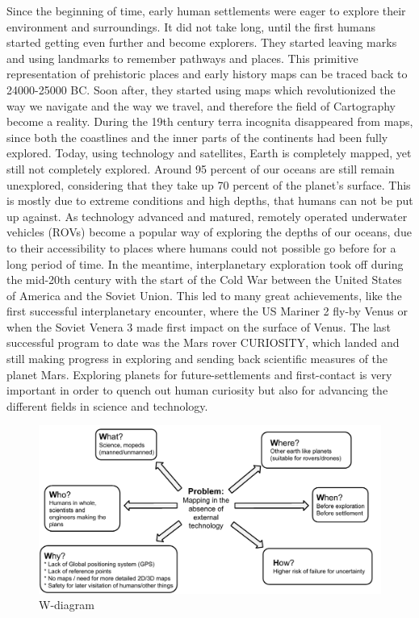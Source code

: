 Since the beginning of time, early human settlements were eager to explore their environment and surroundings. It did not take long, until the first humans started getting even further and become explorers. They started leaving marks and using landmarks to remember pathways and places. This primitive representation of prehistoric places and early history maps can be traced back to 24000-25000 BC\cite{cavedrawings}. Soon after, they started using maps which revolutionized the way we navigate and the way we travel, and therefore the field of Cartography become a reality. During the 19th century terra incognita disappeared from maps, since both the coastlines and the inner parts of the continents had been fully explored. Today, using technology and satellites, Earth is completely mapped, yet still not completely explored. Around 95 percent of our oceans are still remain unexplored, considering that they take up 70 percent of the planet's surface\cite{oceandepth}. This is mostly due to extreme conditions and high depths, that humans can not be put up against. As technology advanced and matured, remotely operated underwater vehicles (ROVs) become a popular way of exploring the depths of our oceans, due to their accessibility to places where humans could not possible go before for a long period of time. In the meantime, interplanetary exploration took off during the mid-20th century with the start of the Cold War between the United States of America and the Soviet Union. This led to many great achievements, like the first successful interplanetary encounter, where the US Mariner 2 fly-by Venus\cite{firstflyby} or when the Soviet Venera 3 made first impact on the surface of Venus\cite{firstimpact}. The last successful program to date was the Mars rover CURIOSITY, which landed and still making progress in exploring and sending back scientific measures of the planet Mars. Exploring planets for future-settlements and first-contact is very important in order to quench out human curiosity but also for advancing the different fields in science and technology.

\begin{figure}[!h]
	\centering
	\includegraphics[scale=.7]{images/wdiagram1.pdf}
	\caption{W-diagram}
	\label{fig:wdiagram}
\end{figure}